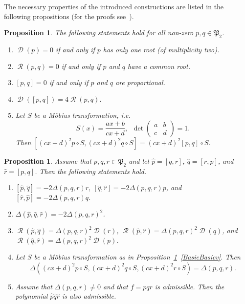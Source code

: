 \documentclass{amsart}
\numberwithin{equation}{section}
\newtheorem{proposition}[theorem]{Proposition}
\theoremstyle{definition}
\theoremstyle{remark}
\DeclareMathOperator{\Res}{\mathcal R}
\DeclareMathOperator{\Discr}{\mathcal D}
\begin{document}
	The necessary properties of the introduced constructions are listed in the following propositions (for the proofs see~\cite[Subsection~2.2]{RichelotExpression}).
	
	\begin{proposition}\label{propBasicBasic}
		The following statements hold for all non-zero $p,q \in \mathfrak P_2$.
		\begin{enumerate}[label=(\roman*)]
			\item\label{BasicBasici} $\Discr(p) = 0$ if and only if $p$ has only one root (of multiplicity two).
			\item\label{BasicBasicii} $\Res(p,q) = 0$ if and only if $p$ and $q$ have a common root.
			\item\label{BasicBasiciii} $[p,q] = 0$ if and only if $p$ and $q$ are proportional.
			\item\label{BasicBasiciv} $\Discr([p,q]) = 4\Res(p,q)$.
			\item\label{BasicBasicv} Let $S$ be a M\"obius transformation, i.e.
			\[
			S(x) = \frac{ax + b}{cx + d}, \;\;\det \begin{pmatrix} a & b \\ c & d \end{pmatrix} = 1.
			\]
			Then $[(cx + d)^2p \circ S, (cx + d)^2q \circ S] = (cx + d)^2[p,q] \circ S$.
		\end{enumerate}
	\end{proposition}
	
	\begin{proposition}\label{propBasicProperties}
		Assume that $p,q,r \in \mathfrak P_2$ and let $\hat p = [q,r]$, $\hat q = [r,p]$, and $\hat r = [p,q]$. Then the following statements hold.
		\begin{enumerate}[label=(\roman*)]
			\item\label{BasicPropertiesi} $[\hat p, \hat q] = -2\Delta(p,q,r)r$, $[\hat q, \hat r] = -2\Delta(p,q,r)p$, and $[\hat r, \hat p] = -2\Delta(p,q,r)q$.
			\item\label{BasicPropertiesii} $\Delta(\hat p, \hat q, \hat r) = -2\Delta(p,q,r)^2$. 
			\item\label{BasicPropertiesiii} $\Res(\hat p, \hat q) = \Delta(p,q,r)^2\Discr(r)$, $\Res(\hat p, \hat r) = \Delta(p,q,r)^2\Discr(q)$, and $\Res(\hat q, \hat r) = \Delta(p,q,r)^2\Discr(p)$.
			\item\label{BasicPropertiesiv} Let $S$ be a M\"obius transformation as in Proposition~\ref{propBasicBasic}~\ref{BasicBasicv}. Then
			\[
			\Delta( (cx + d)^2p \circ S, (cx + d)^2q \circ S, (cx + d)^2r \circ S) = \Delta(p,q,r).     
			\]
			\item\label{BasicPropertiesv} Assume that $\Delta(p,q,r) \ne 0$ and that $f = pqr$ is admissible. Then the polynomial $\hat p \hat q \hat r$ is also admissible.
		\end{enumerate}
	\end{proposition}
	
\end{document}

